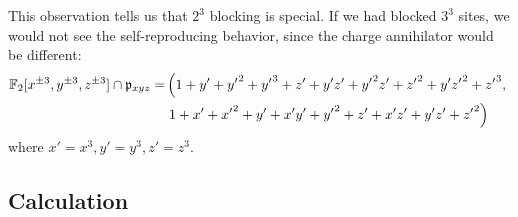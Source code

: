This observation tells us that $2^3$ blocking is special.
If we had blocked $3^3$ sites, we would not see the self-reproducing behavior,
since the charge annihilator would be different:
\begin{align*}
 \mathbb{F}_2[x^{\pm 3}, y^{\pm 3}, z^{\pm 3}] \cap \mathfrak{p}_{xyz} = 
& \left( 1+{y'}+{y'}^2+{y'}^3+{z'}+{y'} {z'}+{y'}^2 {z'}+{z'}^2+{y'} {z'}^2+{z'}^3, \right. \\
& \left. 1+{x'}+{x'}^2+{y'}+{x'} {y'}+{y'}^2+{z'}+{x'} {z'}+{y'} {z'}+{z'}^2 \right)
\end{align*}
where $x'=x^3,y'=y^3,z'=z^3$.

\subsection*{Calculation}

